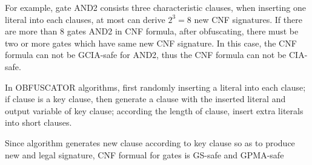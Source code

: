 \documentclass[runningheads,a4paper]{llncs}
\begin{document}
For example, gate AND2 consists three characteristic clauses, when inserting one literal into each clauses, at most can derive $2^3=8$ new CNF signatures.
If there are more than 8 gates AND2 in CNF formula, after obfuscating, there must be two or more gates which have same new CNF signature.
In this case, the CNF formula can not be GCIA-safe for AND2, thus the CNF formula can not be CIA-safe.


In OBFUSCATOR algorithms, first randomly inserting a literal into each clause; 
if clause is a key clause, then generate a clause with the inserted literal and output variable of key clause;
according the length of clause, insert extra literals into short clauses.


% 
% 
% 
% 
% 
% 
% 
Since algorithm generates new clause according to key clause so as to produce new and legal signature, CNF formual for gates is GS-safe and GPMA-safe
\end{document}
